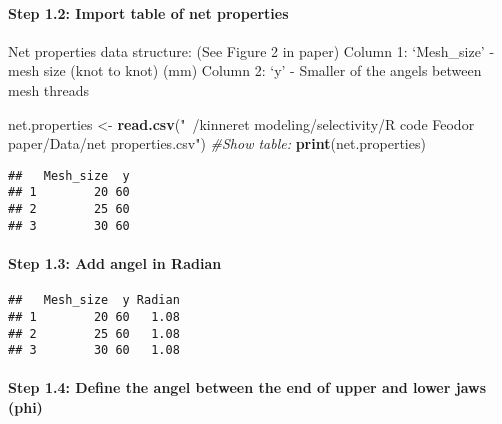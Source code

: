 \documentclass[]{article}
\newenvironment{Shaded}{\begin{snugshade}}{\end{snugshade}}
\newcommand{\KeywordTok}[1]{\textcolor[rgb]{0.13,0.29,0.53}{\textbf{#1}}}
\newcommand{\FloatTok}[1]{\textcolor[rgb]{0.00,0.00,0.81}{#1}}
\newcommand{\StringTok}[1]{\textcolor[rgb]{0.31,0.60,0.02}{#1}}
\newcommand{\CommentTok}[1]{\textcolor[rgb]{0.56,0.35,0.01}{\textit{#1}}}
\newcommand{\OperatorTok}[1]{\textcolor[rgb]{0.81,0.36,0.00}{\textbf{#1}}}
\newcommand{\NormalTok}[1]{#1}
\let\oldparagraph\paragraph
\renewcommand{\paragraph}[1]{\oldparagraph{#1}\mbox{}}
\begin{document}
\paragraph{Step 1.2: Import table of net
properties}\label{step-1.2-import-table-of-net-properties}

Net properties data structure: (See Figure 2 in paper) Column 1:
`Mesh\_size' - mesh size (knot to knot) (mm) Column 2: `y' - Smaller of
the angels between mesh threads

\begin{Shaded}
\begin{Highlighting}[]
\NormalTok{net.properties <-}\StringTok{ }\KeywordTok{read.csv}\NormalTok{(}\StringTok{"~/kinneret modeling/selectivity/R code Feodor paper/Data/net properties.csv"}\NormalTok{)}
\CommentTok{#Show table:}
\KeywordTok{print}\NormalTok{(net.properties)}
\end{Highlighting}
\end{Shaded}

\begin{verbatim}
##   Mesh_size  y
## 1        20 60
## 2        25 60
## 3        30 60
\end{verbatim}

\paragraph{Step 1.3: Add angel in
Radian}\label{step-1.3-add-angel-in-radian}

\begin{Shaded}
\end{Shaded}

\begin{verbatim}
##   Mesh_size  y Radian
## 1        20 60   1.08
## 2        25 60   1.08
## 3        30 60   1.08
\end{verbatim}

\paragraph{Step 1.4: Define the angel between the end of upper and lower
jaws
(phi)}\label{step-1.4-define-the-angel-between-the-end-of-upper-and-lower-jaws-phi}
\end{document}
